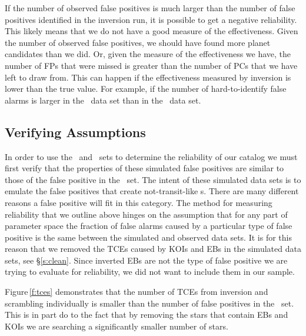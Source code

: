 If the number of observed false positives is much larger than the number of false positives identified in the inversion run, it is possible to get a negative reliability. This likely means that we do not have a good measure of the effectiveness.  Given the number of observed false positives, we should have found more planet candidates than we did. Or, given the measure of the effectiveness we have, the number of FPs that were missed is greater than the number of PCs that we have left to draw from.  This can happen if the effectiveness measured by inversion is lower than the true value. For example, if the number of hard-to-identify false alarms is larger in the \invtce\ data set than in the \opstce\ data set.   

\subsection{Verifying Assumptions}
In order to use the \scrtce\ and \invtce\ sets to determine the reliability of our catalog we must first verify that the properties of these simulated false positives are similar to those of the false positive in the \opstce\ set.  The intent of these simulated data sets is to emulate the false positives that create not-transit-like \opstce s.  There are many different reasons a false positive will fit in this category. The method for measuring reliability that we outline above hinges on the assumption that for any part of parameter space the fraction of false alarms caused by a particular type of false positive is the same between the simulated and observed data sets.  It is for this reason that we removed the TCEs caused by KOIs and EBs in the simulated data sets, see \S\ref{s:clean}. Since inverted EBs are not the type of false positive we are trying to evaluate for reliability, we did not want to include them in our sample.

Figure\,\ref{f:tces} demonstrates that the number of TCEs from inversion and scrambling individually is smaller than the number of false positives in the \opstce\ set. This is in part do to the fact that by removing the stars that contain EBs and KOIs we are searching a significantly smaller number of stars. 


